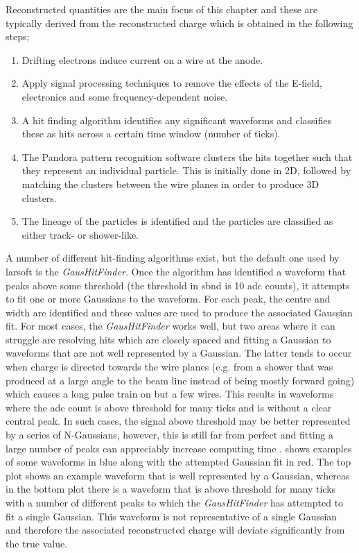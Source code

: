 Reconstructed quantities are the main focus of this chapter and these are typically derived from the reconstructed charge which is obtained in the following steps;
\begin{enumerate}
    \item Drifting electrons induce current on a wire at the anode.
    \item Apply signal processing techniques to remove the effects of the E-field, electronics and some frequency-dependent noise. 
    \item A hit finding algorithm identifies any significant waveforms and classifies these as hits across a certain time window (number of ticks). 
    \item The Pandora pattern recognition software clusters the hits together such that they represent an individual particle. This is initially done in 2D, followed by matching the clusters between the wire planes in order to produce 3D clusters.
    \item The lineage of the particles is identified and the particles are classified as either track- or shower-like.
\end{enumerate}

A number of different hit-finding algorithms exist, but the default one used by \gls{larsoft} is the \textit{GausHitFinder}. Once the algorithm has identified a waveform that peaks above some threshold (the threshold in \gls{sbnd} is 10 \gls{adc} counts), it attempts to fit one or more Gaussians to the waveform. For each peak, the centre and width are identified and these values are used to produce the associated Gaussian fit. For most cases, the \textit{GausHitFinder} works well, but two areas where it can struggle are resolving hits which are closely spaced and fitting a Gaussian to waveforms that are not well represented by a Gaussian. The latter tends to occur when charge is directed towards the wire planes (e.g. from a shower that was produced at a large angle to the beam line instead of being mostly forward going) which causes a long pulse train on but a few wires. This results in waveforms where the \gls{adc} count is above threshold for many ticks and is without a clear central peak. In such cases, the signal above threshold may be better represented by a series of N-Gaussians, however, this is still far from perfect and fitting a large number of peaks can appreciably increase computing time \cite{gaushitfinder}.  shows examples of some waveforms in blue along with the attempted Gaussian fit in red. The top plot shows an example waveform that is well represented by a Gaussian, whereas in the bottom plot there is a waveform that is above threshold for many ticks with a number of different peaks to which the \textit{GausHitFinder} has attempted to fit a single Gaussian. This waveform is not representative of a single Gaussian and therefore the associated reconstructed charge will deviate significantly from the true value.

